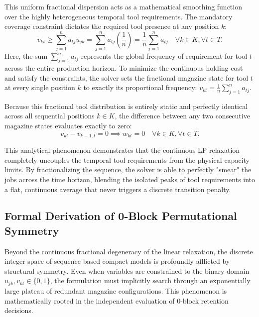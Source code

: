 \documentclass[11pt, a4paper]{book}
\begin{document}
	This uniform fractional dispersion acts as a mathematical smoothing function over the highly heterogeneous temporal tool requirements. The mandatory coverage constraint dictates the required tool presence at any position $k$:
	\begin{equation}
		v_{kt} \ge \sum_{j=1}^{n} a_{tj} u_{jk} = \sum_{j=1}^{n} a_{tj} \left( \frac{1}{n} \right) = \frac{1}{n} \sum_{j=1}^{n} a_{tj} \quad \forall k \in K, \forall t \in T.
	\end{equation}
	Here, the sum $\sum_{j=1}^{n} a_{tj}$ represents the global frequency of requirement for tool $t$ across the entire production horizon. To minimize the continuous holding cost and satisfy the constraints, the solver sets the fractional magazine state for tool $t$ at every single position $k$ to exactly its proportional frequency: $v_{kt} = \frac{1}{n} \sum_{j=1}^{n} a_{tj}$.
	
	Because this fractional tool distribution is entirely static and perfectly identical across all sequential positions $k \in K$, the difference between any two consecutive magazine states evaluates exactly to zero:
	\begin{equation}
		v_{kt} - v_{k-1,t} = 0 \implies w_{kt} = 0 \quad \forall k \in K, \forall t \in T.
	\end{equation}
	
	This analytical phenomenon demonstrates that the continuous LP relaxation completely uncouples the temporal tool requirements from the physical capacity limits. By fractionalizing the sequence, the solver is able to perfectly "smear" the jobs across the time horizon, blending the isolated peaks of tool requirements into a flat, continuous average that never triggers a discrete transition penalty. 
	
	\subsection{Formal Derivation of 0-Block Permutational Symmetry}
	
	Beyond the continuous fractional degeneracy of the linear relaxation, the discrete integer space of sequence-based compact models is profoundly afflicted by structural symmetry. Even when variables are constrained to the binary domain $u_{jk}, v_{kt} \in \{0,1\}$, the formulation must implicitly search through an exponentially large plateau of redundant magazine configurations. This phenomenon is mathematically rooted in the independent evaluation of 0-block retention decisions.
	
\end{document}
